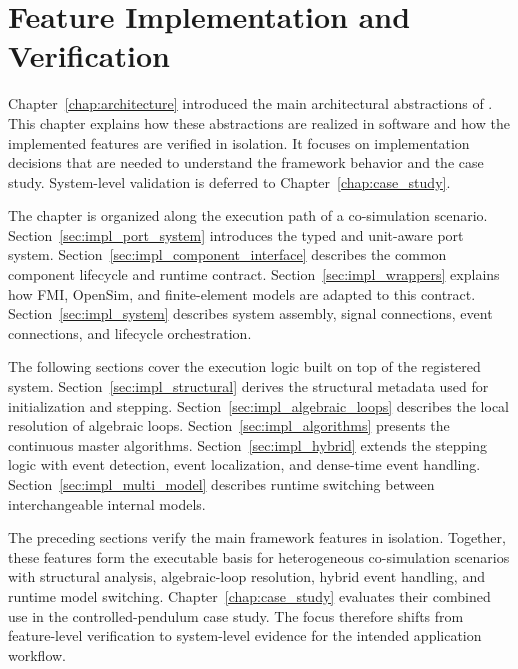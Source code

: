 \chapter{Feature Implementation and Verification}
\label{chap:implementation}

Chapter~\ref{chap:architecture} introduced the main architectural abstractions of \syssimx{}.
This chapter explains how these abstractions are realized in software and how the implemented features are verified in isolation.
It focuses on implementation decisions that are needed to understand the framework behavior and the case study.
System-level validation is deferred to Chapter~\ref{chap:case_study}.

The chapter is organized along the execution path of a co-simulation scenario.
Section~\ref{sec:impl_port_system} introduces the typed and unit-aware port system.
Section~\ref{sec:impl_component_interface} describes the common component lifecycle and runtime contract.
Section~\ref{sec:impl_wrappers} explains how \ac{FMI}, OpenSim, and finite-element models are adapted to this contract.
Section~\ref{sec:impl_system} describes system assembly, signal connections, event connections, and lifecycle orchestration.

The following sections cover the execution logic built on top of the registered system.
Section~\ref{sec:impl_structural} derives the structural metadata used for initialization and stepping.
Section~\ref{sec:impl_algebraic_loops} describes the local resolution of algebraic loops.
Section~\ref{sec:impl_algorithms} presents the continuous master algorithms.
Section~\ref{sec:impl_hybrid} extends the stepping logic with event detection, event localization, and dense-time event handling.
Section~\ref{sec:impl_multi_model} describes runtime switching between interchangeable internal models.











The preceding sections verify the main framework features in isolation.
Together, these features form the executable basis for heterogeneous co-simulation scenarios with structural analysis, algebraic-loop resolution, hybrid event handling, and runtime model switching.
Chapter~\ref{chap:case_study} evaluates their combined use in the controlled-pendulum case study.
The focus therefore shifts from feature-level verification to system-level evidence for the intended application workflow.

